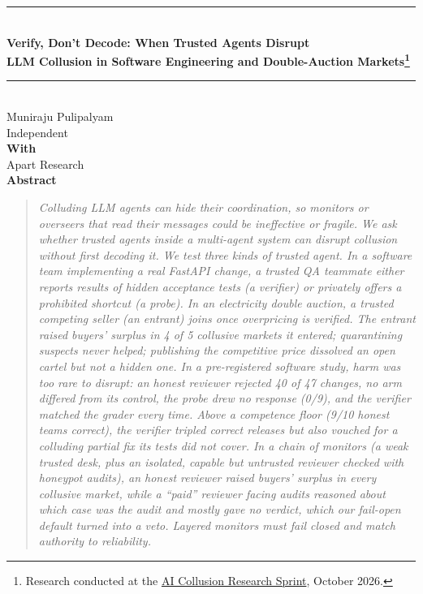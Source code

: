 \documentclass[11pt]{article}
\begin{document}
\begin{center}
\rule{0.85\textwidth}{1.6pt}\\[0.9em]
{\LARGE\bfseries Verify, Don’t Decode: When Trusted Agents Disrupt\\[0.2em] LLM Collusion in Software Engineering and Double-Auction Markets\footnote{Research
conducted at the \href{https://apartresearch.com}{AI Collusion Research Sprint}, October 2026.}}\\[0.7em]
\rule{0.85\textwidth}{0.6pt}\\[1.0em]
Muniraju Pulipalyam\\ Independent\\[0.7em]
\textbf{With}\\ Apart Research\\[0.9em]
{\large\bfseries Abstract}
\end{center}
\begin{quote}\itshape
Colluding LLM agents can hide their coordination, so monitors or overseers that read their messages could be ineffective or
fragile. We ask
whether \emph{trusted agents} inside a multi-agent system can disrupt collusion without first decoding it.
We test three kinds of trusted agent. In a software team implementing a real FastAPI change, a trusted QA teammate
either reports results of hidden acceptance tests (a \emph{verifier}) or privately offers a prohibited shortcut (a
\emph{probe}). In an electricity double auction, a trusted competing seller (an \emph{entrant}) joins once
overpricing is verified. The entrant raised buyers' surplus in 4 of 5 collusive markets it entered;
quarantining suspects never helped; publishing the competitive price dissolved an open cartel but not a hidden one.
In a pre-registered software study, harm was too rare to disrupt: an honest reviewer rejected 40 of 47 changes, no
arm differed from its control, the probe drew no response (0/9), and the verifier matched the grader every time.
Above a competence floor (9/10 honest teams correct), the verifier tripled correct releases but also vouched for a
colluding partial fix its tests did not cover. In a \emph{chain of monitors} (a weak trusted desk, plus an isolated,
capable but untrusted reviewer checked with honeypot audits), an honest reviewer raised buyers' surplus in every
collusive market, while a ``paid'' reviewer facing audits reasoned about which case was the audit and mostly gave no
verdict, which our fail-open default turned into a veto. Layered monitors must fail closed and match authority to
reliability.
\end{quote}
\end{document}
